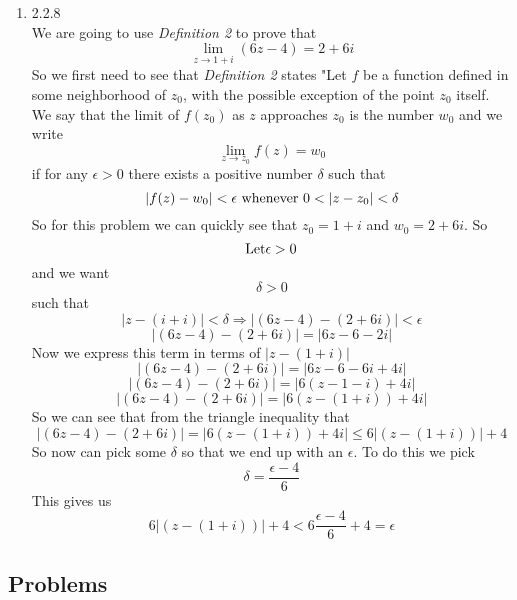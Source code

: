 \documentclass[11pt]{article}
\begin{document}
\begin{enumerate}
\item  2.2.8\\
We are going to use \emph{Definition 2} to prove that $$\lim_{z\rightarrow 1+i}(6z - 4) = 2 + 6i$$
So we first need to see that \emph{Definition 2} states "Let $f$ be a function defined in some neighborhood of $z_0$, with the possible exception of the point $z_0$ itself. We say that the limit of $f(z_0)$ as $z$ approaches $z_0$ is the number $w_0$ and we write
$$\lim_{z\rightarrow z_0} f(z) = w_0$$
if for any $\epsilon > 0$ there exists a positive number $\delta$ such that 
$$|f(z) - w_0|<\epsilon\ \textnormal{whenever}\ 0<|z -z_0| < \delta$$
So for this problem we can quickly see that $z_0 = 1 +i$ and $w_0 = 2 +6i$. So 
$$\textnormal{Let} \epsilon > 0$$
and we want 
$$\delta > 0$$
such that
$$|z - (i+i)|< \delta \Rightarrow |(6z-4)-(2+6i)| < \epsilon$$
$$|(6z - 4)-(2+6i)|= |6z -6 -2i|$$
Now we express this term in terms of $|z - (1+i)|$
$$|(6z - 4)-(2+6i)|= |6z -6 -6i + 4i|$$
$$|(6z - 4)-(2+6i)|= |6(z -1 -i) + 4i|$$
$$|(6z - 4)-(2+6i)|= |6(z -(1+i)) + 4i|$$
So we can see that from the triangle inequality that 
$$|(6z - 4)-(2+6i)|= |6(z -(1+i)) + 4i| \le 6|(z -(1+i))| + 4$$
So now can pick some $\delta$ so that we end up with an $\epsilon$. To do this we pick
$$\delta = \frac{\epsilon - 4}{6}$$
This gives us
$$6|(z -(1+i))| + 4 < 6\frac{\epsilon - 4}{6} +4 = \epsilon$$

\end{enumerate}

\subsection*{Problems}
\end{document}
